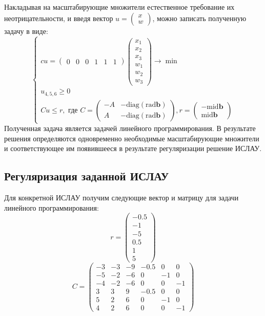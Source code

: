 Накладывая на масштабирующие множители естественное требование их неотрицательности, и введя вектор $u = \begin{pmatrix}
	x \\
	w
\end{pmatrix}$, можно записать полученную задачу в виде:
\begin{equation}
	\begin{cases}
		c u = \begin{pmatrix}
			0 & 0 & 0 & 1 & 1 & 1
		\end{pmatrix} \begin{pmatrix}
		x_1 \\
		x_2 \\
		x_3 \\
		w_1 \\
		w_2 \\
		w_3
	\end{pmatrix} \rightarrow \min \\
	u_{4,5,6} \geq 0 \\
	C u \leq r, \text{ где } C = \begin{pmatrix}
		-A & -\text{diag} (\text{rad} \textbf{b}) \\
		A & -\text{diag} (\text{rad} \textbf{b})
	\end{pmatrix}, r = \begin{pmatrix}
		-\text{mid} \textbf{b} \\
		\text{mid} \textbf{b}
	\end{pmatrix}
	\end{cases}
\end{equation}
Полученная задача является задачей линейного программирования. В результате решения определяются одновременно необходимые масштабирующие множители и соответствующее им появившееся в результате регуляризации решение ИСЛАУ.

\subsection{Регуляризация заданной ИСЛАУ}
Для конкретной ИСЛАУ получим следующие вектор и матрицу для задачи линейного программирования:
\begin{equation}
	r=
	\begin{pmatrix}
		-0.5 \\
		-1 \\
		-5 \\
		0.5 \\
		1 \\
		5
	\end{pmatrix}
\end{equation}
\begin{equation}
	C =
	\begin{pmatrix}
		-3 & -3 & -9 & -0.5 & 0 & 0 \\
		-5 & -2 & -6 & 0 & -1 & 0 \\
		-4 & -2 & -6 & 0 & 0 & -1 \\
		3 & 3 & 9 & -0.5 & 0 & 0 \\
		5 & 2 & 6 & 0 & -1 & 0 \\
		4 & 2 & 6 & 0 & 0 & -1
	\end{pmatrix}
\end{equation}



